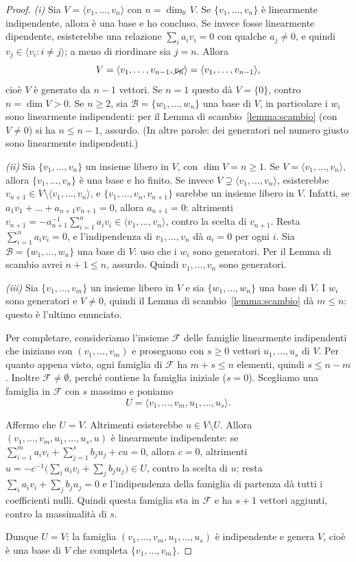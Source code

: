 \documentclass[11pt,a4paper]{article}
\newcommand{\KK}{\mathbb{K}}
\theoremstyle{plain}
\theoremstyle{definition}
\theoremstyle{remark}
\begin{document}
\begin{proof}
\emph{(i)} Sia $V=\langle v_1,\dots,v_n\rangle$ con $n=\dim_{\KK}V$.
Se $\{v_1,\dots,v_n\}$ è linearmente indipendente, allora è una base e ho concluso.
Se invece fosse linearmente dipendente, esisterebbe una relazione $\sum_ia_iv_i=0$ con qualche $a_j\ne0$, e quindi $v_j\in\langle v_i: i\ne j\rangle$; a meno di riordinare sia $j=n$. Allora
\[
  V=\langle v_1,\dots,v_{n-1},\cancel{v_n}\rangle=\langle v_1,\dots,v_{n-1}\rangle ,
\]
cioè $V$ è generato da $n-1$ vettori. Se $n=1$ questo dà $V=\{0\}$, contro $n=\dim V>0$. Se $n\ge2$, sia $\mathcal B=\{w_1,\dots,w_n\}$ una base di $V$, in particolare i $w_i$ sono linearmente indipendenti: per il Lemma di scambio~\ref{lemma:scambio} (con $V\ne0$) si ha $n\le n-1$, assurdo.
(In altre parole: dei generatori nel numero giusto sono linearmente indipendenti.)

\emph{(ii)} Sia $\{v_1,\dots,v_n\}$ un insieme libero in $V$, con $\dim V=n\ge1$.
Se $V=\langle v_1,\dots,v_n\rangle$, allora $\{v_1,\dots,v_n\}$ è una base e ho finito.
Se invece $V\supsetneq\langle v_1,\dots,v_n\rangle$, esisterebbe $v_{n+1}\in V\setminus\langle v_1,\dots,v_n\rangle$, e $\{v_1,\dots,v_n,v_{n+1}\}$ sarebbe un insieme libero in $V$. Infatti, se $a_1v_1+\dots+a_{n+1}v_{n+1}=0$, allora $a_{n+1}=0$: altrimenti $v_{n+1}=-a_{n+1}^{-1}\sum_{i=1}^na_iv_i\in\langle v_1,\dots,v_n\rangle$, contro la scelta di $v_{n+1}$. Resta $\sum_{i=1}^na_iv_i=0$, e l'indipendenza di $v_1,\dots,v_n$ dà $a_i=0$ per ogni $i$.
Sia $\mathcal B=\{w_1,\dots,w_n\}$ una base di $V$: uso che i $w_i$ sono generatori.
Per il Lemma di scambio avrei $n+1\le n$, assurdo.
Quindi $v_1,\dots,v_n$ sono generatori.

\emph{(iii)} Sia $\{v_1,\dots,v_m\}$ un insieme libero in $V$ e sia $\{w_1,\dots,w_n\}$ una base di $V$. I $w_i$ sono generatori e $V\ne0$, quindi il Lemma di scambio~\ref{lemma:scambio} dà $m\le n$: questo è l'ultimo enunciato.

Per completare, consideriamo l'insieme $\mathcal F$ delle famiglie
linearmente indipendenti che iniziano con
$(v_1,\dots,v_m)$ e proseguono con $s\ge0$ vettori
$u_1,\dots,u_s$ di $V$.
Per quanto appena visto, ogni famiglia di $\mathcal F$ ha
$m+s\le n$ elementi, quindi $s\le n-m$.
Inoltre $\mathcal F\neq\emptyset$, perché contiene la famiglia iniziale
($s=0$). Scegliamo una famiglia in $\mathcal F$ con $s$ massimo
e poniamo
\[
 U=\langle v_1,\dots,v_m,u_1,\dots,u_s\rangle.
\]

Affermo che $U=V$. Altrimenti esisterebbe $u\in V\setminus U$. Allora $(v_1,\dots,v_m,u_1,\dots,u_s,u)$ è linearmente indipendente: se
$\sum_{i=1}^{m}a_iv_i+\sum_{j=1}^{s}b_ju_j+cu=0$, allora $c=0$, altrimenti $u=-c^{-1}\bigl(\sum_ia_iv_i+\sum_jb_ju_j\bigr)\in U$, contro la scelta di $u$; resta $\sum_ia_iv_i+\sum_jb_ju_j=0$ e l'indipendenza della famiglia di partenza dà tutti i coefficienti nulli. Quindi questa famiglia sta in $\mathcal F$ e ha $s+1$ vettori aggiunti, contro la massimalità di $s$.

Dunque $U=V$: la famiglia $(v_1,\dots,v_m,u_1,\dots,u_s)$ è indipendente e genera $V$, cioè è una base di $V$ che completa $\{v_1,\dots,v_m\}$.
\end{proof}
\end{document}
